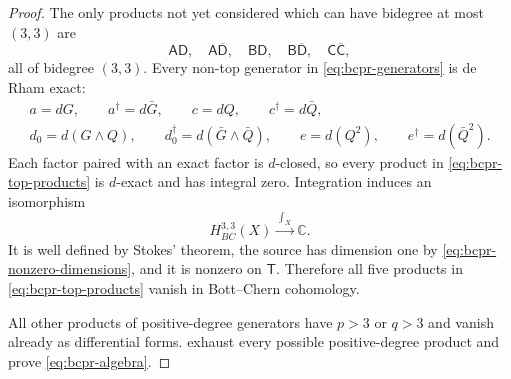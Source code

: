 \begin{proof}
The only products not yet considered which can have bidegree at most
$(3,3)$ are
\begin{equation}
 \mathsf A\mathsf D,\quad
 \mathsf A\overline{\mathsf D},\quad
 \mathsf B\mathsf D,\quad
 \mathsf B\overline{\mathsf D},\quad
 \mathsf C\overline{\mathsf C},
\label{eq:bcpr-top-products}
\end{equation}
all of bidegree $(3,3)$.  Every non-top generator in
\cref{eq:bcpr-generators} is de Rham exact:
\begin{equation}
\begin{gathered}
 a=dG,\qquad a^\dagger=d\bar G,\qquad
 c=dQ,\qquad c^\dagger=d\bar Q,\\
 d_0=d(G\wedge Q),\qquad
 d_0^\dagger=d(\bar G\wedge\bar Q),\qquad
 e=d(Q^2),\qquad e^\dagger=d(\bar Q^2).
\end{gathered}
\label{eq:bcpr-de-rham-primitives}
\end{equation}
Each factor paired with an exact factor is $d$-closed, so every product in
\cref{eq:bcpr-top-products} is $d$-exact and has integral zero.  Integration
induces an isomorphism
\begin{equation}
 H^{3,3}_{BC}(X)\xrightarrow{\ \int_X\ }\mathbb C.
\label{eq:bcpr-top-integration}
\end{equation}
It is well defined by Stokes' theorem, the source has dimension one by
\cref{eq:bcpr-nonzero-dimensions}, and it is nonzero on $\mathsf T$.
Therefore all five products in \cref{eq:bcpr-top-products} vanish in
Bott--Chern cohomology.

All other products of positive-degree generators have $p>3$ or $q>3$ and
vanish already as differential forms.
exhaust every possible positive-degree product
and prove \cref{eq:bcpr-algebra}.
\end{proof}
